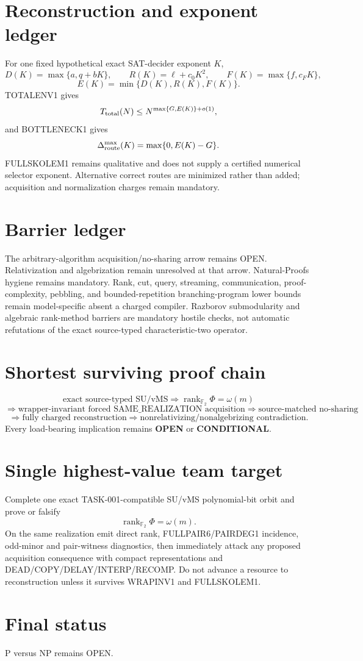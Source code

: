 \documentclass[11pt]{article}
\begin{document}
\section*{Reconstruction and exponent ledger}
For one fixed hypothetical exact SAT-decider exponent \(K\),
\[
D(K)=\max\{a,q+bK\},\qquad R(K)=\ell+c_0K^2,\qquad F(K)=\max\{f,c_FK\},
\]
\[
E(K)=\min\{D(K),R(K),F(K)\}.
\]
TOTALENV1 gives
\[
T_{\rm total}(N)\le N^{\max\{G,E(K)\}+o(1)},
\]
and BOTTLENECK1 gives
\[
\Delta_{\rm route}^{\max}(K)=\max\{0,E(K)-G\}.
\]
FULLSKOLEM1 remains qualitative and does not supply a certified numerical selector exponent. Alternative correct routes are minimized rather than added; acquisition and normalization charges remain mandatory.

\section*{Barrier ledger}
The arbitrary-algorithm acquisition/no-sharing arrow remains OPEN. Relativization and algebrization remain unresolved at that arrow. Natural-Proofs hygiene remains mandatory. Rank, cut, query, streaming, communication, proof-complexity, pebbling, and bounded-repetition branching-program lower bounds remain model-specific absent a charged compiler. Razborov submodularity and algebraic rank-method barriers are mandatory hostile checks, not automatic refutations of the exact source-typed characteristic-two operator.

\section*{Shortest surviving proof chain}
\[
\text{exact source-typed SU/vMS}
\Longrightarrow
\operatorname{rank}_{\mathbb F_2}\Phi=\omega(m)
\]
\[
\Longrightarrow
\boxed{\text{wrapper-invariant forced SAME\_REALIZATION acquisition}}
\Longrightarrow
\text{source-matched no-sharing}
\]
\[
\Longrightarrow
\text{fully charged reconstruction}
\Longrightarrow
\text{nonrelativizing/nonalgebrizing contradiction}.
\]
Every load-bearing implication remains \textbf{OPEN} or \textbf{CONDITIONAL}.

\section*{Single highest-value team target}
Complete one exact TASK-001-compatible SU/vMS polynomial-bit orbit and prove or falsify
\[
\boxed{\operatorname{rank}_{\mathbb F_2}\Phi=\omega(m)}.
\]
On the same realization emit direct rank, FULLPAIR6/PAIRDEG1 incidence, odd-minor and pair-witness diagnostics, then immediately attack any proposed acquisition consequence with compact representations and DEAD/COPY/DELAY/INTERP/RECOMP. Do not advance a resource to reconstruction unless it survives WRAPINV1 and FULLSKOLEM1.

\section*{Final status}
P versus NP remains OPEN.
\end{document}
